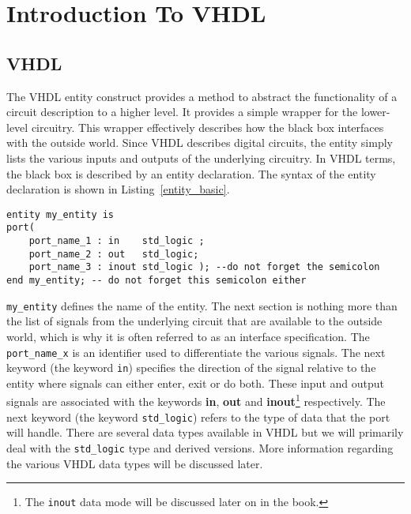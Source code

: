\chapter{Introduction To VHDL}

\section{VHDL}
The VHDL entity construct provides a method to abstract the functionality of a circuit description to a higher level. It provides a simple wrapper for the lower-level circuitry. This wrapper effectively describes how the black box interfaces with the outside world. Since VHDL describes digital circuits, the entity simply lists the various inputs and outputs of the underlying circuitry. In VHDL terms, the black box is described by an entity declaration. The syntax of the entity declaration is shown in Listing~\ref{entity_basic}.

\noindent
\begin{minipage}{0.99\linewidth}
    \begin{lstlisting}[style=VHDLStyle, label=entity_basic, caption=The entity declaration in VHDL., mathescape=true]
entity my_entity is
port(
    port_name_1 : in    std_logic ;
    port_name_2 : out   std_logic;
    port_name_3 : inout std_logic ); --do not forget the semicolon
end my_entity; -- do not forget this semicolon either
\end{lstlisting}
\end{minipage}

\texttt{my\_entity} defines the name of the entity. The next section is nothing more than the list of signals from the underlying circuit that are available to the outside world, which is why it is often referred to as an interface specification. The \texttt{port\_name\_x} is an identifier used to differentiate the various signals. The next keyword (the keyword \texttt{in}) specifies the direction of the signal relative to the entity where signals can either enter, exit or do both. These input and output signals are associated with the keywords \textbf{in}, \textbf{out} and \textbf{inout}\footnote{The \texttt{inout} data mode will be discussed later on in the book.} respectively. The next keyword (the keyword \texttt{std\_logic}) refers to the type of data that the port will handle. There are several data types available in VHDL but we will primarily deal with the \texttt{std\_logic} type and derived versions. More information regarding the various VHDL data types will be discussed later.

